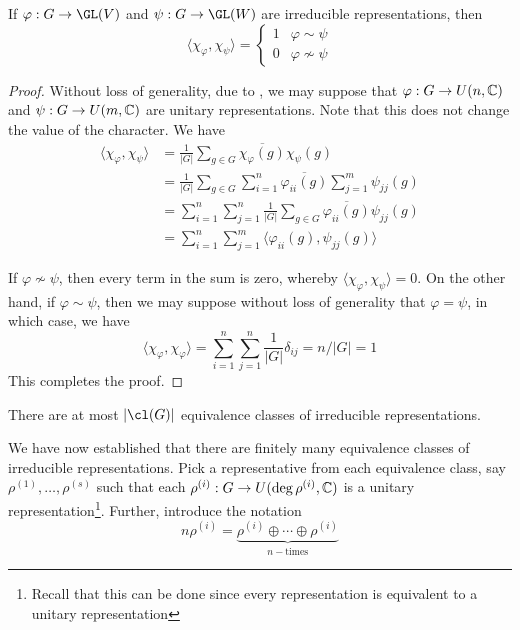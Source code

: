 \begin{theorem}
    If $\varphi: G\to\GL(V)$ and $\psi: G\to\GL(W)$ are irreducible representations, then 
    \begin{equation*}
        \langle\chi_\varphi,\chi_\psi\rangle = 
        \begin{cases}
            1 & \varphi\sim\psi\\
            0 & \varphi\not\sim\psi
        \end{cases}
    \end{equation*}
\end{theorem}
\begin{proof}
    Without loss of generality, due to , we may suppose that $\varphi: G\to U(n,\mathbb{C})$ and $\psi: G\to U(m,\mathbb{C})$ are unitary representations. Note that this does not change the value of the character. We have
    \begin{align*}
        \langle\chi_\varphi,\chi_\psi\rangle &= \frac{1}{|G|}\sum_{g\in G}\overline{\chi_{\varphi}(g)}\chi_\psi(g)\\
        &= \frac{1}{|G|}\sum_{g\in G}\sum_{i = 1}^n\overline{\varphi_{ii}(g)}\sum_{j = 1}^m\psi_{jj}(g)\\
        &= \sum_{i = 1}^n\sum_{j = 1}^n\frac{1}{|G|}\sum_{g\in G}\overline{\varphi_{ii}(g)}\psi_{jj}(g)\\
        &= \sum_{i = 1}^n\sum_{j = 1}^m\langle\varphi_{ii}(g),\psi_{jj}(g)\rangle
    \end{align*}

    If $\varphi\not\sim\psi$, then every term in the sum is zero, whereby $\langle\chi_\varphi,\chi_\psi\rangle = 0$. On the other hand, if $\varphi\sim\psi$, then we may suppose without loss of generality that $\varphi = \psi$, in which case, we have 
    \begin{equation*}
        \langle\chi_\varphi,\chi_\varphi\rangle = \sum_{i = 1}^n\sum_{j = 1}^n\frac{1}{|G|}\delta_{ij} = n/|G| = 1
    \end{equation*}
    This completes the proof. 
\end{proof}

\begin{corollary}
    There are at most $|\cl(G)|$ equivalence classes of irreducible representations.
\end{corollary}

We have now established that there are finitely many equivalence classes of irreducible representations. Pick a representative from each equivalence class, say $\rho^{(1)},\ldots,\rho^{(s)}$ such that each $\rho^{(i)}: G\to U(\deg\rho^{(i)}, \mathbb{C})$ is a unitary representation\footnote{Recall that this can be done since every representation is equivalent to a unitary representation}. Further, introduce the notation 
\begin{equation*}
    n\rho^{(i)} = \underbrace{\rho^{(i)}\oplus\cdots\oplus\rho^{(i)}}_{n-\text{times}}
\end{equation*}

